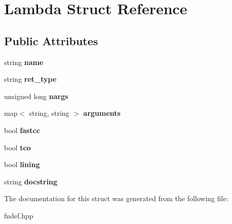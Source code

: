 \hypertarget{structLambda}{
\section{Lambda Struct Reference}
\label{structLambda}
}
\subsection*{Public Attributes}
\begin{DoxyCompactItemize}
\item 
\hypertarget{structLambda_a289f62f08113ee05dcd6038f5785549e}{
string {\bfseries name}}
\label{structLambda_a289f62f08113ee05dcd6038f5785549e}

\item 
\hypertarget{structLambda_a2e0271d03ceaa0cf02b92f570ed86637}{
string {\bfseries ret\_\-type}}
\label{structLambda_a2e0271d03ceaa0cf02b92f570ed86637}

\item 
\hypertarget{structLambda_ace6dd93e8972c2abf820f6875c1cb53b}{
unsigned long {\bfseries nargs}}
\label{structLambda_ace6dd93e8972c2abf820f6875c1cb53b}

\item 
\hypertarget{structLambda_a3e41ab2e01aa054ea49e01bddb14f7af}{
map$<$ string, string $>$ {\bfseries arguments}}
\label{structLambda_a3e41ab2e01aa054ea49e01bddb14f7af}

\item 
\hypertarget{structLambda_a768b3c61cc18d43b9e4d54312611b653}{
bool {\bfseries fastcc}}
\label{structLambda_a768b3c61cc18d43b9e4d54312611b653}

\item 
\hypertarget{structLambda_a0023c87f80cd4b7cac05d8b0517fd0ee}{
bool {\bfseries tco}}
\label{structLambda_a0023c87f80cd4b7cac05d8b0517fd0ee}

\item 
\hypertarget{structLambda_ac3e3d2559f4b95571d6e6a6fc4fddea8}{
bool {\bfseries lining}}
\label{structLambda_ac3e3d2559f4b95571d6e6a6fc4fddea8}

\item 
\hypertarget{structLambda_aadf382267d79bc1c5146bf666f9d216e}{
string {\bfseries docstring}}
\label{structLambda_aadf382267d79bc1c5146bf666f9d216e}

\end{DoxyCompactItemize}


The documentation for this struct was generated from the following file:\begin{DoxyCompactItemize}
\item 
fndef.hpp\end{DoxyCompactItemize}
